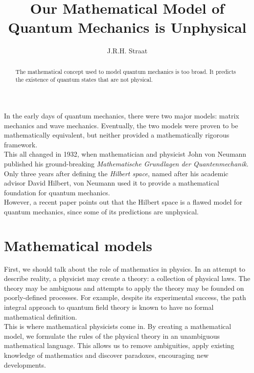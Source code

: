 \documentclass[12pt]{article}
\title{Our Mathematical Model of Quantum Mechanics is Unphysical}      %
\author{J.R.H. Straat}
\date{}
\begin{document}
\renewcommand{\abstractname}{}
\maketitle
%
\begin{abstract}
	The mathematical concept used to model quantum mechanics is too broad. It predicts the existence of quantum states that are not physical.
\end{abstract}
%
\begin{multicols}{2}
    In the early days of quantum mechanics, there were two major models: matrix mechanics and wave mechanics. Eventually, the two models were proven to be mathematically equivalent, but neither provided a mathematically rigorous framework.\\
    This all changed in 1932, when mathematician and physicist John von Neumann published his ground-breaking \textit{Mathematische Grundlagen der Quantenmechanik}\cite{von_neumann_mathematische_1996}. Only three years after defining the \textit{Hilbert space}, named after his academic advisor David Hilbert, von Neumann used it to provide a mathematical foundation for quantum mechanics.\\
    However, a recent paper\cite{carcassi_unphysicality_2023} points out that the Hilbert space is a flawed model for quantum mechanics, since some of its predictions are unphysical.
    \section*{Mathematical models}
    First, we should talk about the role of mathematics in physics. In an attempt to describe reality, a physicist may create a theory: a collection of physical laws. The theory may be ambiguous and attempts to apply the theory may be founded on poorly-defined processes. For example, despite its experimental success, the path integral approach to quantum field theory is known to have no formal mathematical definition.\\
    This is where mathematical physicists come in. By creating a mathematical model, we formulate the rules of the physical theory in an unambiguous mathematical language. This allows us to remove ambiguities, apply existing knowledge of mathematics and discover paradoxes, encouraging new developments.

\end{multicols}
\end{document}

